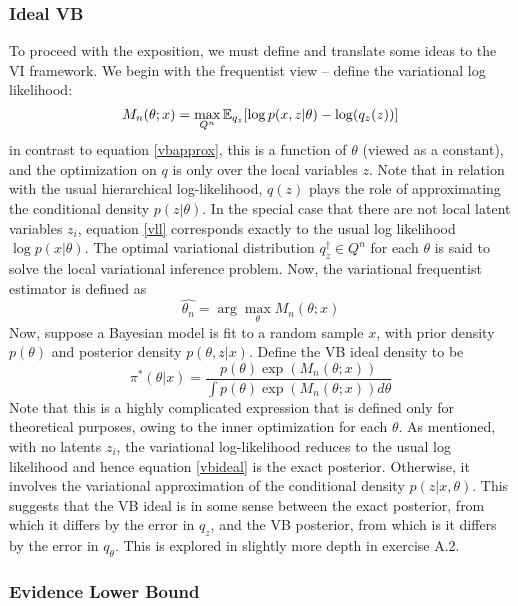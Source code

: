 \subsubsection{Ideal VB}
To proceed with the exposition, we must define and translate some ideas to the VI framework. We begin with the frequentist view -- define the variational log likelihood:
\begin{equation}
\label{vll}
M_n(\theta; x) = \max_{Q^n} \mathbb{E}_{q_z}[\log p(x,z|\theta) - \log(q_z(z))]
\end{equation}
%
in contrast to equation \ref{vbapprox}, this is a function of $\theta$ (viewed as a constant), and the optimization on $q$ is only over the local variables $z$. Note that in relation with the usual hierarchical log-likelihood, $q(z)$ plays the role of approximating the conditional density $p(z|\theta)$. In the special case that there are not local latent variables $z_i$, equation \ref{vll} corresponds exactly to the usual log likelihood $\log p(x|\theta)$. The optimal variational distribution $q_z^{\dagger} \in Q^n$ for each $\theta$ is said to solve the local variational inference problem. Now, the variational frequentist estimator is defined as
\begin{equation}
\hat{\theta_n} = \arg \max_{\theta} M_n(\theta; x)
\end{equation}
Now, suppose a Bayesian model is fit to a random sample $x$, with prior density $p(\theta)$ and posterior density $p(\theta, z |x)$. Define the VB ideal density to be
\begin{equation}
\label{vbideal}
\pi^*(\theta|x) = \frac{p(\theta)\exp(M_n(\theta; x))}{\int p(\theta)\exp(M_n(\theta;x))d\theta}
\end{equation}
%
Note that this is a highly complicated expression that is defined only for theoretical purposes, owing to the inner optimization for each $\theta$. As mentioned, with no latents $z_i$, the variational log-likelihood reduces to the usual log likelihood and hence equation \ref{vbideal} is the exact posterior. Otherwise, it involves the variational approximation of the conditional density $p(z|x, \theta)$. This suggests that the VB ideal is in some sense between the exact posterior, from which it differs by the error in $q_z$, and the VB posterior, from which is it differs by the error in $q_\theta$. This is explored in slightly more depth in exercise A.2. 

\subsubsection{Evidence Lower Bound}

